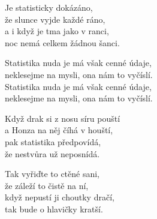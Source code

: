 
\ve
Je statisticky dokázáno,\\
že slunce vyjde každé ráno,\\
a i když je tma jako v ranci,\\
noc nemá celkem žádnou šanci.

\cho{}
Statistika nuda je má však cenné údaje,\\
neklesejme na mysli, ona nám to vyčíslí.\\
Statistika nuda je má však cenné údaje,\\
neklesejme na mysli, ona nám to vyčíslí.

\ve
Když drak si z nosu síru pouští\\
a Honza na něj číhá v houští,\\
pak statistika předpovídá,\\
že nestvůra už neposnídá.

\ve
Tak vyřiďte to ctěné sani,\\
že záleží to čistě na ní,\\
když nepustí ji choutky dračí,\\
tak bude o hlavičky kratší.

\cho{}
\esong